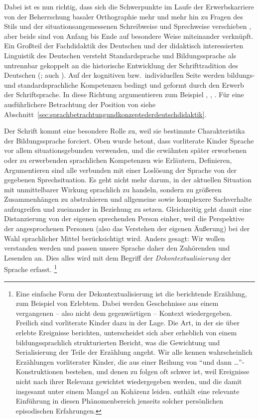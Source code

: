 Dabei ist es nun richtig, dass sich die Schwerpunkte im Laufe der Erwerbskarriere von der Beherrschung basaler Orthographie mehr und mehr hin zu Fragen des Stils und der situationsangemessenen Schreibweise und Sprechweise verschieben \citep[77]{Portmanntselikas2011}, aber beide sind von Anfang bis Ende auf besondere Weise miteinander verknüpft.
Ein Großteil der Fachdidaktik des Deutschen und der didaktisch interessierten Linguistik des Deutschen versteht Standardsprache und Bildungssprache als untrennbar gekoppelt an die historische Entwicklung der Schrifttradition des Deutschen (\citealt[130--150]{Bredel2013}; auch \citealt{Nerius2007}).
Auf der kognitiven bzw.\ individuellen Seite werden bildungs- und standardsprachliche Kompetenzen bedingt und geformt durch den Erwerb der Schriftsprache.
In diese Richtung argumentieren zum Beispiel \citet[4,12,14,15]{Eisenberg2004}, \citet[71,78]{Portmanntselikas2011}, \citet[6]{Feilke2012}.
Für eine ausführlichere Betrachtung der Position von \citet{Bredel2013} siehe Abschnitt~\ref{sec:sprachbetrachtungundkonzeptederdeutschdidaktik}.

\Np

Der Schrift kommt eine besondere Rolle zu, weil sie bestimmte Charakteristika der Bildungssprache forciert.
Oben wurde betont, dass vorliterate Kinder Sprache vor allem situationsgebunden verwenden, und die erwähnten später erworbenen oder zu erwerbenden sprachlichen Kompetenzen wie Erläutern, Definieren, Argumentieren sind alle verbunden mit einer Loslösung der Sprache von der gegebenen Sprechsituation.
Es geht nicht mehr darum, in der aktuellen Situation mit unmittelbarer Wirkung sprachlich zu handeln, sondern zu größeren Zusammenhängen zu abstrahieren und allgemeine sowie komplexere Sachverhalte aufzugreifen und zueinander in Beziehung zu setzen.
Gleichzeitig geht damit eine Distanzierung von der eigenen sprechenden Person einher, weil die Perspektive der angesprochenen Personen (also das Verstehen der eigenen Äußerung) bei der Wahl sprachlicher Mittel berücksichtigt wird.
Anders gesagt:
Wir wollen verstanden werden und passen unsere Sprache daher den Zuhörenden und Lesenden an.
Dies alles wird mit dem Begriff der \textit{Dekontextualisierung} der Sprache erfasst.%
\footnote{Eine einfache Form der Dekontextualisierung ist die berichtende Erzählung, zum Beispiel von Erlebtem.
Dabei werden Geschehnisse aus einem vergangenen -- also nicht dem gegenwärtigen -- Kontext wiedergegeben.
Freilich sind vorliterate Kinder dazu in der Lage.
Die Art, in der sie über erlebte Ereignisse berichten, unterscheidet sich aber erheblich von einem bildungssprachlich strukturierten Bericht, was die Gewichtung und Serialisierung der Teile der Erzählung angeht.
Wir alle kennen wahrscheinlich Erzählungen vorliterater Kinder, die aus einer Reihung von "`und dann \ldots"'-Konstruktionen bestehen, und denen zu folgen oft schwer ist, weil Ereignisse nicht nach ihrer Relevanz gewichtet wiedergegeben werden, und die damit insgesamt unter einem Mangel an Kohärenz leiden.
\citet{Bredel2013} enthält eine relevante Einführung in diesen Phänomenbereich jenseits solcher persönlichen episodischen Erfahrungen.}

